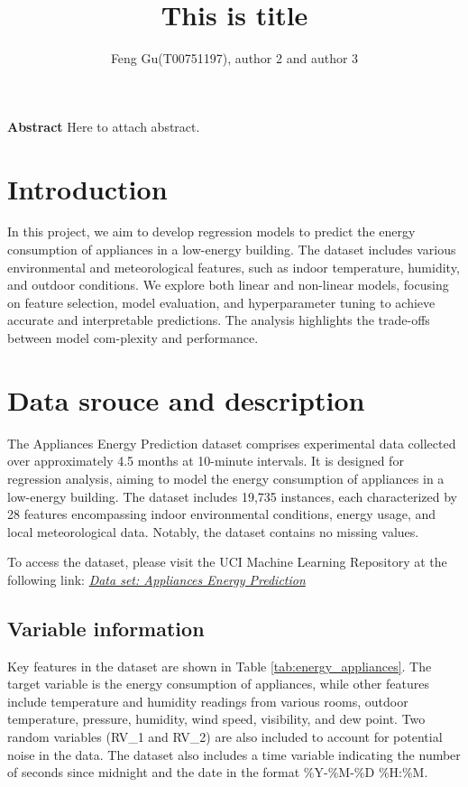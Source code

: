 \documentclass[12pt]{article}
\title{
This is title
}
\author{Feng Gu(T00751197), author 2 and author 3}
\begin{document}
\maketitle

\begin{center}
    \textbf{\large Abstract}
    Here to attach abstract.
\end{center}

\section{Introduction}
In this project, we aim to develop regression models to predict the energy consumption
 of appliances in a low-energy building. The dataset includes various environmental and 
 meteorological features, such as indoor temperature, humidity, and outdoor conditions. 
We explore both linear and non-linear models, focusing on feature selection, model evaluation,
and hyperparameter tuning to achieve accurate and interpretable predictions. 
The analysis highlights the trade-offs between model com-plexity and performance.

\section{Data srouce and description}

The Appliances Energy Prediction dataset comprises experimental data collected over approximately 4.5 months
at 10-minute intervals. It is designed for regression analysis, aiming to model the energy consumption
of appliances in a low-energy building. The dataset includes 19,735 instances, each characterized by
28 features encompassing indoor environmental conditions, energy usage, and local meteorological data.
Notably, the dataset contains no missing values.

To access the dataset, please visit the UCI Machine Learning Repository at the following link:
\href{https://archive.ics.uci.edu/dataset/374/appliances+energy+prediction}{\textit{Data set: Appliances Energy Prediction}}

\subsection{Variable information}
Key features in the dataset are shown in Table \ref{tab:energy_appliances}. 
The target variable is the energy consumption of appliances, 
while other features include temperature and humidity readings from various rooms, 
outdoor temperature, pressure, humidity, wind speed, visibility, and dew point. 
Two random variables (RV\_1 and RV\_2) are also included to account for potential noise in the data.
The dataset also includes a time variable indicating the number of seconds since midnight and 
the date in the format \%Y-\%M-\%D \%H:\%M.
\end{document}
